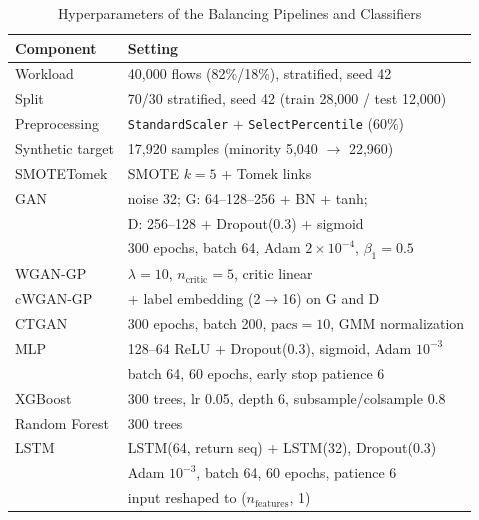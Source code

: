 ﻿\documentclass[journal]{IEEEtran}
\begin{document}
\begin{table}[!t]
\caption{Hyperparameters of the Balancing Pipelines and Classifiers}
\label{tab:hparams}
\begin{center}
\begin{tabular}{@{}ll@{}}
\toprule
\textbf{Component} & \textbf{Setting} \\
\midrule
Workload & 40{,}000 flows (82\%/18\%), stratified, seed 42 \\
Split & 70/30 stratified, seed 42 (train 28{,}000 / test 12{,}000) \\
Preprocessing & \texttt{StandardScaler} + \texttt{SelectPercentile} (60\%) \\
Synthetic target & 17{,}920 samples (minority 5{,}040 $\rightarrow$ 22{,}960) \\
SMOTETomek & SMOTE $k{=}5$ + Tomek links \\
GAN & noise 32; G: 64--128--256 + BN + tanh; \\
 & D: 256--128 + Dropout(0.3) + sigmoid \\
 & 300 epochs, batch 64, Adam $2\times10^{-4}$, $\beta_1{=}0.5$ \\
WGAN-GP & $\lambda{=}10$, $n_{\mathrm{critic}}{=}5$, critic linear \\
cWGAN-GP & + label embedding (2$\rightarrow$16) on G and D \\
CTGAN & 300 epochs, batch 200, $\mathrm{pacs}{=}10$, GMM normalization \\
MLP & 128--64 ReLU + Dropout(0.3), sigmoid, Adam $10^{-3}$ \\
 & batch 64, 60 epochs, early stop patience 6 \\
XGBoost & 300 trees, lr 0.05, depth 6, subsample/colsample 0.8 \\
Random Forest & 300 trees \\
LSTM & LSTM(64, return seq) + LSTM(32), Dropout(0.3) \\
 & Adam $10^{-3}$, batch 64, 60 epochs, patience 6 \\
 & input reshaped to ($n_{\mathrm{features}}$, 1) \\
\bottomrule
\end{tabular}
\end{center}
\end{table}
\end{document}
